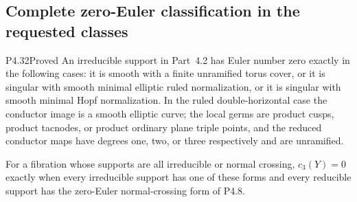 \subsection{Complete zero-Euler classification in the requested classes}

\begin{statement}{P4.32}{Proved}
An irreducible support in Part~4.2 has Euler number zero exactly
in the following cases: it is smooth with a finite unramified
torus cover, or it is singular with smooth minimal elliptic ruled
normalization, or it is singular with smooth minimal Hopf
normalization. In the ruled double-horizontal case the conductor
image is a smooth elliptic curve; the local germs are product
cusps, product tacnodes, or product ordinary plane triple points,
and the reduced conductor maps have degrees one, two, or three
respectively and are unramified.

For a fibration whose supports are all irreducible or normal
crossing, $c_3(Y)=0$ exactly when every irreducible support has
one of these forms and every reducible support has the
zero-Euler normal-crossing form of P4.8.
\end{statement}
